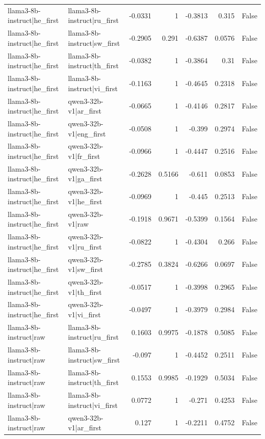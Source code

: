 \begin{table}
\begin{tabular}{l l r r r r l}
llama3-8b-instruct|he_first & llama3-8b-instruct|ru_first & -0.0331 & 1 & -0.3813 & 0.315 & False \\
llama3-8b-instruct|he_first & llama3-8b-instruct|sw_first & -0.2905 & 0.291 & -0.6387 & 0.0576 & False \\
llama3-8b-instruct|he_first & llama3-8b-instruct|th_first & -0.0382 & 1 & -0.3864 & 0.31 & False \\
llama3-8b-instruct|he_first & llama3-8b-instruct|vi_first & -0.1163 & 1 & -0.4645 & 0.2318 & False \\
llama3-8b-instruct|he_first & qwen3-32b-v1|ar_first & -0.0665 & 1 & -0.4146 & 0.2817 & False \\
llama3-8b-instruct|he_first & qwen3-32b-v1|eng_first & -0.0508 & 1 & -0.399 & 0.2974 & False \\
llama3-8b-instruct|he_first & qwen3-32b-v1|fr_first & -0.0966 & 1 & -0.4447 & 0.2516 & False \\
llama3-8b-instruct|he_first & qwen3-32b-v1|ga_first & -0.2628 & 0.5166 & -0.611 & 0.0853 & False \\
llama3-8b-instruct|he_first & qwen3-32b-v1|he_first & -0.0969 & 1 & -0.445 & 0.2513 & False \\
llama3-8b-instruct|he_first & qwen3-32b-v1|raw & -0.1918 & 0.9671 & -0.5399 & 0.1564 & False \\
llama3-8b-instruct|he_first & qwen3-32b-v1|ru_first & -0.0822 & 1 & -0.4304 & 0.266 & False \\
llama3-8b-instruct|he_first & qwen3-32b-v1|sw_first & -0.2785 & 0.3824 & -0.6266 & 0.0697 & False \\
llama3-8b-instruct|he_first & qwen3-32b-v1|th_first & -0.0517 & 1 & -0.3998 & 0.2965 & False \\
llama3-8b-instruct|he_first & qwen3-32b-v1|vi_first & -0.0497 & 1 & -0.3979 & 0.2984 & False \\
llama3-8b-instruct|raw & llama3-8b-instruct|ru_first & 0.1603 & 0.9975 & -0.1878 & 0.5085 & False \\
llama3-8b-instruct|raw & llama3-8b-instruct|sw_first & -0.097 & 1 & -0.4452 & 0.2511 & False \\
llama3-8b-instruct|raw & llama3-8b-instruct|th_first & 0.1553 & 0.9985 & -0.1929 & 0.5034 & False \\
llama3-8b-instruct|raw & llama3-8b-instruct|vi_first & 0.0772 & 1 & -0.271 & 0.4253 & False \\
llama3-8b-instruct|raw & qwen3-32b-v1|ar_first & 0.127 & 1 & -0.2211 & 0.4752 & False \\

\end{tabular}
\end{table}
